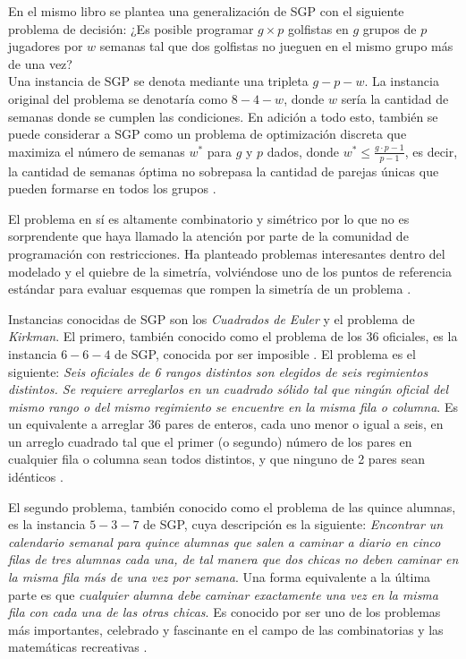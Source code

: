 \documentclass[letter, 10pt]{article}
\begin{document}
En el mismo libro se plantea una generalización de SGP con el siguiente problema de decisión: ¿Es posible programar $g\times p$ golfistas en $g$ grupos de $p$ jugadores por $w$ semanas tal que dos golfistas no jueguen en el mismo grupo más de una vez?\\
Una instancia de SGP se denota mediante una tripleta $g-p-w$. La instancia original del problema se denotaría como $8-4-w$, donde $w$ sería la cantidad de semanas donde se cumplen las condiciones. En adición a todo esto, también se puede considerar a SGP como un problema de optimización discreta que maximiza el número de semanas $w^*$ para $g$ y $p$ dados, donde $w^*\leq \frac{g\cdot p - 1}{p - 1}$, es decir, la cantidad de semanas óptima no sobrepasa la cantidad de parejas únicas que pueden formarse en todos los grupos \cite{GolferRevisitedLiu}.  

El problema en sí es altamente combinatorio y simétrico por lo que no es sorprendente que haya llamado la atención por parte de la comunidad de programación con restricciones. Ha planteado problemas interesantes dentro del modelado y el quiebre de la simetría, volviéndose uno de los puntos de referencia estándar para evaluar esquemas que rompen la simetría de un problema \cite{dotu2005scheduling}.

Instancias conocidas de SGP son los \textit{Cuadrados de Euler} y el problema de \textit{Kirkman}. El primero, también conocido como el problema de los 36 oficiales, es la instancia $6-6-4$ de SGP, conocida por ser imposible \cite{SolTriska1}. El problema es el siguiente: \textit{Seis oficiales de 6 rangos distintos son elegidos de seis regimientos distintos. Se requiere arreglarlos en un cuadrado sólido tal que ningún oficial del mismo rango o del mismo regimiento se encuentre en la misma fila o columna}. Es un equivalente a arreglar 36 pares de enteros, cada uno menor o igual a seis, en un arreglo cuadrado tal que el primer (o segundo) número de los pares en cualquier fila o columna sean todos distintos, y que ninguno de 2 pares sean idénticos \cite{EulerOfficer}.

El segundo problema, también conocido como el problema de las quince alumnas, es la instancia $5-3-7$ de SGP, cuya descripción es la siguiente: \textit{Encontrar un calendario semanal para quince alumnas que salen a caminar a diario en cinco filas de tres alumnas cada una, de tal manera que dos chicas no deben caminar en la misma fila más de una vez por semana}. Una forma equivalente a la última parte es que \textit{cualquier alumna debe caminar exactamente una vez en la misma fila con cada una de las otras chicas}. Es conocido por ser uno de los problemas más importantes, celebrado y fascinante en el campo de las combinatorias y las matemáticas recreativas \cite{PAVONE2023113316}.
\end{document}
